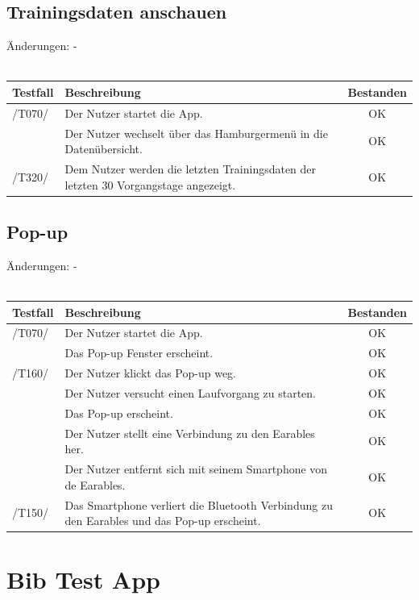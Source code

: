 \documentclass[a4paper,12pt]{article}
\newcommand{\testok}[0]{
	\cellcolor{green!25} OK
}
\begin{document}
\subsection{Trainingsdaten anschauen}
Änderungen: -
\\
\\
\begin{tabular}{ |p{1.5cm} | p{12cm} | c| }
	\hline
	\textbf{Testfall} & \textbf{Beschreibung} & \textbf{Bestanden}\\
	\hline
	/T070/ & Der Nutzer startet die App. & \testok \\
	\hline
	& Der Nutzer wechselt über das Hamburgermenü in die Datenübersicht. & \testok  \\
	\hline
	/T320/ & Dem Nutzer werden die letzten Trainingsdaten der letzten 30 Vorgangstage angezeigt. & \testok  \\
	\hline
\end{tabular}

\subsection{Pop-up}
Änderungen: -
\\
\\
\begin{tabular}{ |p{1.5cm} | p{12cm} | c| }
	\hline
	\textbf{Testfall} & \textbf{Beschreibung} & \textbf{Bestanden}\\
	\hline
	/T070/ & Der Nutzer startet die App. & \testok \\
	\hline
	& Das Pop-up Fenster erscheint. & \testok  \\
	\hline
	/T160/ & Der Nutzer klickt das Pop-up weg. & \testok  \\
	\hline
	& Der Nutzer versucht einen Laufvorgang zu starten. & \testok  \\
	\hline
	& Das Pop-up erscheint. & \testok  \\
	\hline
	& Der Nutzer stellt eine Verbindung zu den Earables her. & \testok  \\
	\hline
	& Der Nutzer entfernt sich mit seinem Smartphone von de Earables. & \testok  \\
	\hline
	/T150/ & Das Smartphone verliert die Bluetooth Verbindung zu den Earables und das Pop-up erscheint. & \testok  \\
	\hline
\end{tabular}



\section{Bib Test App}
\end{document}
